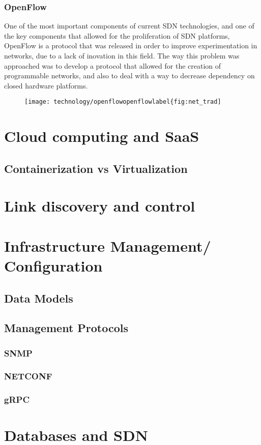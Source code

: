 \subsubsection {OpenFlow}

One of the most important components of current SDN technologies, and one of the key components that allowed for the proliferation of SDN platforms, OpenFlow is a protocol that was released in order to improve experimentation
in networks, due to a lack of inovation in this field. The way this problem was approached was to develop a protocol that allowed for the creation of programmable networks, and also to deal with a way to decrease 
dependency on closed hardware platforms.

\begin{figure}[!tbph]
  \centering
  {\texttt{[image: technology/openflowopenflowlabel\{fig:net\_trad]}}
\end{figure}

\section {Cloud computing and SaaS}
\subsection {Containerization vs Virtualization}
\section {Link discovery and control}
\section {Infrastructure Management/ Configuration}
\subsection {Data Models}
\subsection {Management Protocols}
\subsubsection {SNMP}
\subsubsection {NETCONF}
\subsubsection {gRPC}
\section {Databases and SDN} %

